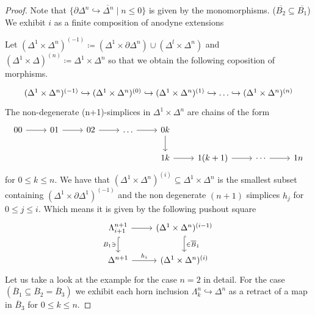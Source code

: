 \begin{proof}
    Note that 
    $\overline{\{\partial \Delta^n \hookrightarrow \Delta^n \mid n \leq 0 \}}$
    is given by the monomorphisms.
    ($\overline{B_2} \subseteq \overline{B_1}$) 
    We exhibit $i$ as a finite composition of anodyne extensions
    
    Let $(\Delta^1 \times \Delta^n)^{(-1)} \coloneqq(\Delta^1 \times \partial \Delta^n) \cup ( \Delta^{l} \times \Delta^n)$ and $(\Delta^1 \times \Delta)^{(n)} \coloneqq\Delta^1 \times \Delta^n$ so that we obtain the following coposition of morphisms.
    \[
    \begin{tikzcd}
        (\Delta^1 \times \Delta^n)^{(-1)} \hookrightarrow (\Delta^1 \times \Delta^n)^{(0)} \hookrightarrow (\Delta^1 \times \Delta^n)^{(1)}\hookrightarrow \dotsc \hookrightarrow(\Delta^1 \times \Delta^n)^{(n)} 
    \end{tikzcd}
    \]
    The non-degenerate (n+1)-simplices in $\Delta^1 \times \Delta^n$ are chains of the form
    \[
    \begin{tikzcd}
        00
        \ar[r]
        &
        01
        \ar[r]
        &
        02
        \ar[r]
        &
        \dotsc
        \ar[r]
        &
        0k
        \ar[d]
        \\
        &&&&
        1k
        \ar[r]
        &
        1(k+1)
        \ar[r]
        &
        \cdots
        \ar[r]
        &
        1n
    \end{tikzcd}
    \]
    for $0 \leq k \leq n$.
    We have that $(\Delta^1 \times \Delta^n)^{(i)} \subseteq \Delta^1 \times \Delta^n$ is the smallest subset containing $( \Delta^1 \times \partial \Delta^1)^{(-1)}$ and the non degenerate $(n+1)$ simplices $h_j$ for $0 \leq j \leq i$.
    Which means it is given by the following pushout square
    \[
    \begin{tikzcd}
        \Lambda_{i+1}^{n+1}
        \ar[r]
        \ar[d, hook, " B_1 \ni"']
        &
        (\Delta^1 \times \Delta^n)^{(i-1)}
        \ar[d, hook, "\in \overline{B}_1"]
        \\
        \Delta^{n+1} 
        \ar[r, "h_i"]
        &
        (\Delta^1 \times \Delta^n)^{(i)}
    \end{tikzcd}
    \]
    Let us take a look at the example for the case $n=2$ in detail.
    For the case $(\overline{B}_1 \subseteq \overline{B}_2 = \overline{B}_3 )$ we exhibit each horn inclusion $\Lambda_k^n \hookrightarrow \Delta^n$ as a retract of a map in $\overline{B}_3$ for $0 \leq k \leq n$.

\end{proof}

